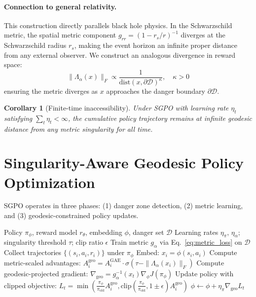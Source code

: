 \documentclass{article}
\newtheorem{corollary}{Corollary}
\begin{document}
\paragraph{Connection to general relativity.} This construction directly parallels black hole physics. In the Schwarzschild metric, the spatial metric component $g_{rr} = (1 - r_s/r)^{-1}$ diverges at the Schwarzschild radius $r_s$, making the event horizon an infinite proper distance from any external observer. We construct an analogous divergence in reward space:
\begin{equation}
    \|\Lambda_\alpha(x)\|_F \propto \frac{1}{\text{dist}(x, \partial\mathcal{D})^\kappa}, \quad \kappa > 0
\end{equation}
ensuring the metric diverges as $x$ approaches the danger boundary $\partial\mathcal{D}$.

\begin{corollary}[Finite-time inaccessibility]
Under SGPO with learning rate $\eta_t$ satisfying $\sum_t \eta_t < \infty$, the cumulative policy trajectory remains at infinite geodesic distance from any metric singularity for all time.
\end{corollary}

\section{Singularity-Aware Geodesic Policy Optimization}
\label{sec:sgpo}

SGPO operates in three phases: (1) danger zone detection, (2) metric learning, and (3) geodesic-constrained policy updates.

\begin{algorithm}[t]
\caption{SGPO: Singularity-Aware Geodesic Policy Optimization}
\label{alg:sgpo}
\begin{algorithmic}[1]
\REQUIRE Policy $\pi_\phi$, reward model $r_\theta$, embedding $\phi$, danger set $\mathcal{D}$
\REQUIRE Learning rates $\eta_\pi$, $\eta_\alpha$; singularity threshold $\tau$; clip ratio $\epsilon$
\STATE Train metric $g_\alpha$ via Eq.~\ref{eq:metric_loss} on $\mathcal{D}$
    \STATE Collect trajectories $\{(s_i, a_i, r_i)\}$ under $\pi_\phi$
    \STATE Embed: $x_i = \phi(s_i, a_i)$
    \STATE Compute metric-scaled advantages:
    \STATE \quad $A_i^\text{geo} = A_i^\text{GAE} \cdot \sigma\left(\tau - \|\Lambda_\alpha(x_i)\|_F\right)$
    \STATE Compute geodesic-projected gradient:
    \STATE \quad $\nabla_\text{geo} = g_\alpha^{-1}(x_t) \nabla_\phi J(\pi_\phi)$
    \STATE Update policy with clipped objective:
    \STATE \quad $L_t = \min\left(\frac{\pi_\phi}{\pi_\text{old}} A_i^\text{geo}, \text{clip}\left(\frac{\pi_\phi}{\pi_\text{old}}, 1\pm\epsilon\right) A_i^\text{geo}\right)$
    \STATE \quad $\phi \leftarrow \phi + \eta_\pi \nabla_\text{geo} L_t$
\ENDFOR
\end{algorithmic}
\end{algorithm}
\end{document}
